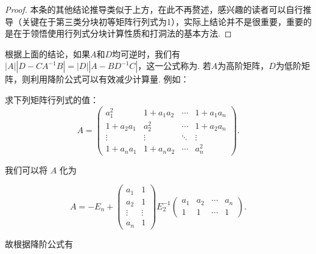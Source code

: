 \begin{enumerate}
\begin{proof}
              本条的其他结论推导类似于上方，在此不再赘述，感兴趣的读者可以自行推导（关键在于第三类分块初等矩阵行列式为1），实际上结论并不是很重要，重要的是在于领悟使用行列式分块计算性质和打洞法的基本方法.
          \end{proof}

          根据上面的结论，如果$A$和$D$均可逆时，我们有$|A||D-CA^{-1}B|=|D||A-BD^{-1}C|$，这一公式称为. 若$A$为高阶矩阵，$D$为低阶矩阵，则利用降阶公式可以有效减少计算量. 例如：

          \begin{example}{}{}
              求下列矩阵行列式的值：
              \[A=\begin{pmatrix}
                      a_1^2    & 1+a_1a_2   & \cdots & 1+a_1a_n \\
                      1+a_2a_1 & a_2^2    & \cdots & 1+a_2a_n \\
                      \vdots   & \vdots   & \ddots & \vdots   \\
                      1+a_na_1 & 1+a_na_2 & \cdots & a_n^2
                  \end{pmatrix}.\]
          \end{example}

          \begin{solution}
              我们可以将 $A$ 化为

              \[ A = -E_n + \begin{pmatrix}
                      a_1 & 1 \\ a_2 & 1 \\ \vdots & \vdots \\ a_n & 1
                  \end{pmatrix} E_2^{-1} \begin{pmatrix}
                      a_1 & a_2 & \cdots & a_n \\ 1 & 1 & \cdots & 1
                  \end{pmatrix}. \]

              故根据降阶公式有


\end{solution}
\end{enumerate}
